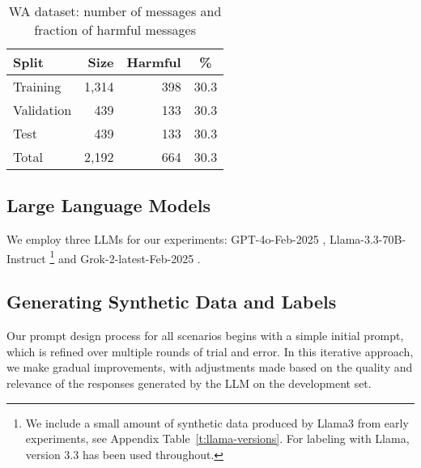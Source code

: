 \begin{table}
\centering
\begin{tabular}{lrrc}
\textbf{Split}  & \textbf{Size} & \textbf{Harmful}  & \textbf{\%} \\
\hline     
Training        &  1,314        &   398    &  30.3 \\ 
Validation      &    439        &   133    &  30.3 \\ 
Test            &    439        &   133    &  30.3 \\     
\hline
Total           &  2,192        &   664    &  30.3 \\ 
\hline
\end{tabular}
\caption{WA dataset: number of messages and fraction of harmful messages}
\label{t:dataset-stat}
\end{table}






\subsection{Large Language Models}

We employ three LLMs for our experiments: 
GPT-4o-Feb-2025 \cite{openai-2024-gpt},
Llama-3.3-70B-Instruct \cite{meta-2024-llama33}\footnote{We include a small amount
    of synthetic data produced by Llama3 from early experiments,
    see Appendix Table~\ref{t:llama-versions}.
    For labeling with Llama, version 3.3 has been used throughout.
} and Grok-2-latest-Feb-2025 \cite{xai-2024-grok}.


\subsection{Generating Synthetic Data and Labels}

Our prompt design process for all scenarios begins with a simple initial prompt, which is %
refined over multiple rounds of trial and error.
In this iterative approach, we make gradual improvements, with adjustments made based on the quality and relevance of the responses generated by the LLM on the development set.


